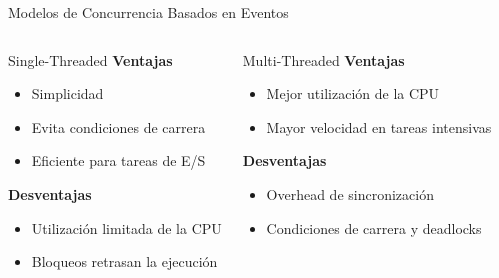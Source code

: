 \documentclass[11pt]{beamer}
\begin{document}
	\begin{frame}{Modelos de Concurrencia Basados en Eventos}
		
	\small
		\begin{columns}[T]
			
			\begin{block}{Single-Threaded}
				\textbf{Ventajas}
				\begin{itemize}
					\item Simplicidad
					\item Evita condiciones de carrera
					\item Eficiente para tareas de E/S
				\end{itemize}
				
				\vspace{0.2cm}
				\textbf{Desventajas}
				\begin{itemize}
					\item Utilización limitada de la CPU
					\item Bloqueos retrasan la ejecución
				\end{itemize}
			\end{block}
			
			
			\begin{block}{Multi-Threaded}
				\textbf{Ventajas}
				\begin{itemize}
					\item Mejor utilización de la CPU
					\item Mayor velocidad en tareas intensivas
				\end{itemize}
				
				\vspace{0.2cm}
				\textbf{Desventajas}
				\begin{itemize}
					\item Overhead de sincronización
					\item Condiciones de carrera y deadlocks
				\end{itemize}
			\end{block}
			
		\end{columns}
	\end{frame}
	
\end{document}
